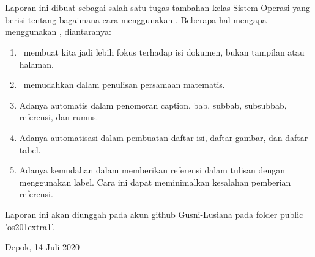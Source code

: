 \chapter*{\kataPengantar}
Laporan ini dibuat sebagai salah satu tugas tambahan kelas Sistem Operasi yang berisi tentang bagaimana cara menggunakan \latex.
Beberapa hal mengapa menggunakan \latex, diantaranya:

\begin{enumerate}
	\item \latex~membuat kita jadi lebih fokus terhadap isi dokumen, bukan 
		tampilan atau halaman. 
	\item \latex~memudahkan dalam penulisan persamaan matematis. 
	\item Adanya automatis dalam penomoran caption, bab, subbab, subsubbab, 
		referensi, dan rumus. 
	\item Adanya automatisasi dalam pembuatan daftar isi, daftar gambar, dan
		daftar tabel. 
	\item Adanya kemudahan dalam memberikan referensi dalam tulisan dengan 
		menggunakan label. Cara ini dapat meminimalkan kesalahan pemberian 
		referensi. 
\end{enumerate}

Laporan ini akan diunggah pada akun github Gusni-Lusiana pada folder public 'os201extra1'.

\vspace*{0.1cm}
\begin{flushright}
Depok, 14 Juli 2020\\[0.1cm]
\vspace*{1cm}
\penulis

\end{flushright}